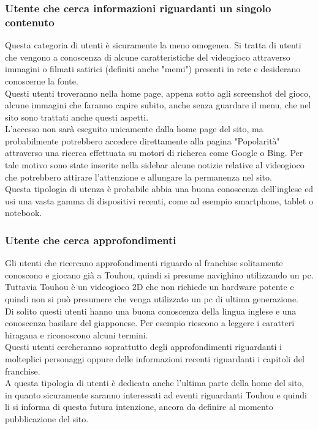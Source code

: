 \documentclass[openany, a4paper, 12pt]{report}
\begin{document}
		\subsubsection{Utente che cerca informazioni riguardanti un singolo contenuto}
		Questa categoria di utenti è sicuramente la meno omogenea. Si tratta di utenti che vengono a conoscenza di alcune caratteristiche del videogioco attraverso immagini o filmati satirici (definiti anche "memi") presenti in rete e desiderano conoscerne la fonte.\\
		Questi utenti troveranno nella home page, appena sotto agli screenshot del gioco, alcune immagini che faranno capire subito, anche senza guardare il menu, che nel sito sono trattati anche questi aspetti.\\
		L'accesso non sarà eseguito unicamente dalla home page del sito, ma probabilmente potrebbero accedere direttamente alla pagina "Popolarità" attraverso una ricerca effettuata su motori di richerca come Google o Bing. Per tale motivo sono state inserite nella sidebar alcune notizie relative al videogioco che potrebbero attirare l'attenzione e allungare la permanenza nel sito.\\
		Questa tipologia di utenza è probabile abbia una buona conoscenza dell'inglese ed usi una vasta gamma di dispositivi recenti, come ad esempio smartphone, tablet o notebook.\\
		\subsubsection{Utente che cerca approfondimenti}
		Gli utenti che ricercano approfondimenti riguardo al franchise solitamente conoscono e giocano già a Touhou, quindi si presume navighino utilizzando un pc. Tuttavia Touhou è un videogioco 2D che non richiede un hardware potente e quindi non si può presumere che venga utilizzato un pc di ultima generazione.\\
		Di solito questi utenti hanno una buona conoscenza della lingua inglese e una conoscenza basilare del giapponese. Per esempio riescono a leggere i caratteri hiragana e riconoscono alcuni termini.\\
		Questi utenti cercheranno soprattutto degli approfondimenti riguardanti i molteplici personaggi oppure delle informazioni recenti riguardanti i capitoli del franchise.\\
		A questa tipologia di utenti è dedicata anche l'ultima parte della home del sito, in quanto sicuramente saranno interessati ad eventi riguardanti Touhou e quindi li si informa di questa futura intenzione, ancora da definire al momento pubblicazione del sito.
\end{document}
